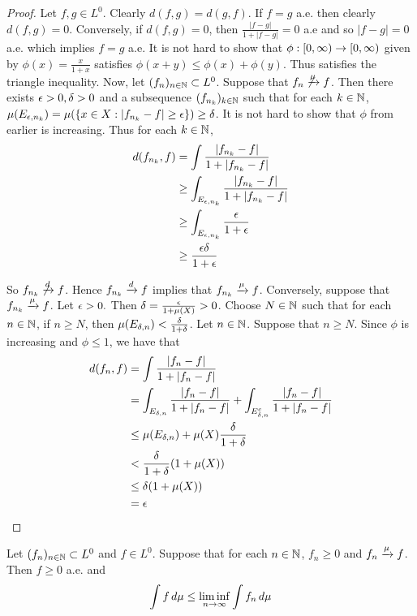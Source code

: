 \documentclass{book}
\begin{document}
	\begin{proof}
		Let $f,g \in L^0$. Clearly $d(f,g) = d(g,f)$. If $f = g$ a.e. then clearly $d(f,g) = 0$. Conversely, if $d(f,g) = 0$, then $\frac{|f-g|}{1 + |f-g|} = 0$ a.e and so $|f-g| = 0$ a.e. which implies $f =g$ a.e. It is not hard to show that $\phi: [0,\infty) \rightarrow [0,\infty)$ given by $\phi(x) = \frac{x}{1+x}$ satisfies $\phi(x+y) \leq \phi(x)+\phi(y)$. Thus satisfies the triangle inequality. Now, let $(f_n)_{n \in \mathbb{N}} \subset L^0$. Suppose that $f_n \not \xrightarrow{\mu} f$. Then there exists $\epsilon>0, \delta>0$ and a subsequence $(f_{n_k})_{k \in \mathbb{N}}$ such that for each $k \in \mathbb{N}$, $\mu(E_{\epsilon,n_k}) = \mu(\{x \in X: |f_{n_k} - f| \geq \epsilon\}) \geq \delta $. It is not hard to show that $\phi$ from earlier is increasing. Thus for each $k \in \mathbb{N}$, 
		\begin{align*}
			d(f_{n_k},f)
			&= \int \frac{|f_{n_k} -f|}{1+|f_{n_k} -f|}\\
			& \geq \int_{E_{\epsilon,n_k}} \frac{|f_{n_k} -f|}{1+|f_{n_k} -f|}\\
			& \geq \int_{E_{\epsilon, n_k}} \frac{\epsilon}{1+\epsilon}\\
			& \geq \frac{\epsilon\delta}{1+\epsilon}
		\end{align*}
		
		So $f_{n_k} \not \xrightarrow{d} f$. Hence $f_{n_k} \xrightarrow{d} f$ implies that $f_{n_k} \xrightarrow{\mu} f$. Conversely, suppose that $f_{n_k} \xrightarrow{\mu} f$. Let $\epsilon >0.$ Then $\delta = \frac{\epsilon}{1+\mu(X)} > 0$. Choose $N \in \mathbb{N}$ such that for each $n \in \mathbb{N}$, if $n \geq N$, then $\mu(E_{\delta, n}) < \frac{\delta}{1+\delta}$. Let $n \in \mathbb{N}$. Suppose that $n \geq N$. Since $\phi$ is increasing and $\phi \leq 1$, we have that 
		\begin{align*}
			d(f_n,f)
			&= \int \frac{|f_n -f|}{1+|f_n -f|}\\
			&= \int_{E_{\delta,n}} \frac{|f_n -f|}{1+|f_n -f|} + \int_{E_{\delta,n}^c} \frac{|f_n -f|}{1+|f_n -f|}\\
			&\leq \mu(E_{\delta,n}) + \mu(X)\frac{\delta}{1+\delta}\\
			& < \frac{\delta}{1+\delta}(1+\mu(X))\\
			& \leq \delta(1+\mu(X))\\
			& = \epsilon
		\end{align*}
	\end{proof}
	
	\begin{ex}  
		Let $(f_n)_{n \in \mathbb{N}} \subset L^0$ and $f \in L^0$. Suppose that for each $n \in \mathbb{N}$, $f_n \geq 0$ and $f_n \xrightarrow{\mu} f$. Then $f \geq 0$ a.e. and $$\int f \, d \mu \leq \liminf \limits_{n \rightarrow \infty} \int f_n \, d \mu $$
	\end{ex}
	
\end{document}
